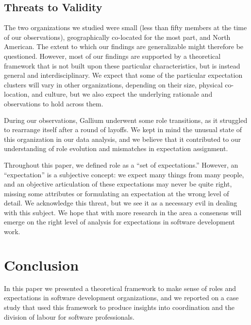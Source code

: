 \documentclass[10pt, conference, compsocconf]{IEEEtran}
\begin{document}


\subsection{Threats to Validity}

The two organizations we studied were small (less than fifty members at the time of our observations), geographically co-located for the most part, and North American. The extent to which our findings are generalizable might therefore be questioned. However, most of our findings are supported by a theoretical framework that is not built upon these particular characteristics, but is instead general and interdisciplinary. We expect that some of the particular expectation clusters will vary in other organizations, depending on their size, physical co-location, and culture, but we also expect the underlying rationale and observations to hold across them.

During our observations, Gallium underwent some role transitions, as it struggled to rearrange itself after a round of layoffs. We kept in mind the unusual state of this organization in our data analysis, and we believe that it contributed to our understanding of role evolution and mismatches in expectation assignment.

Throughout this paper, we defined role as a ``set of expectations.'' However, an ``expectation'' is a subjective concept: we expect many things from many people, and an objective articulation of these expectations may never be quite right, missing some attributes or formulating an expectation at the wrong level of detail. We acknowledge this threat, but we see it as a necessary evil in dealing with this subject. We hope that with more research in the area a consensus will emerge on the right level of analysis for expectations in software development work.




\section{Conclusion}

In this paper we presented a theoretical framework to make sense of roles and expectations in software development organizations, and we reported on a case study that used this framework to produce insights into coordination and the division of labour for software professionals.
\end{document}

